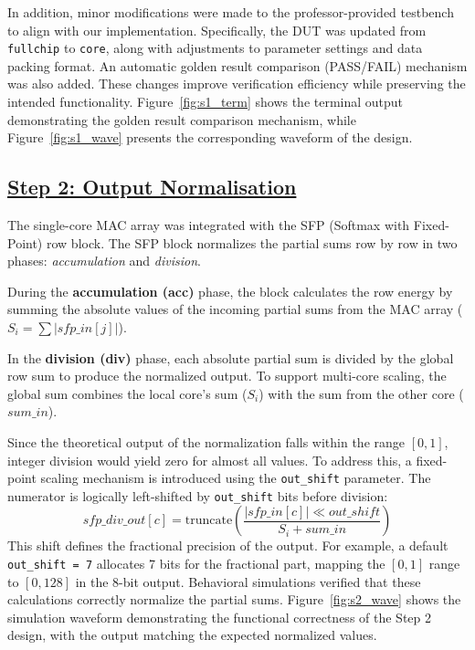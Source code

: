 \documentclass[journal]{IEEEtran}
\begin{document}
In addition, minor modifications were made to the professor-provided testbench to align with our implementation. Specifically, the DUT was updated from \texttt{fullchip} to \texttt{core}, along with adjustments to parameter settings and data packing format. An automatic golden result comparison (PASS/FAIL) mechanism was also added. These changes improve verification efficiency while preserving the intended functionality. Figure~\ref{fig:s1_term} shows the terminal output demonstrating the golden result comparison mechanism, while Figure~\ref{fig:s1_wave} presents the corresponding waveform of the design.




\subsection{\underline{\textnormal{Step 2: Output Normalisation}}}
The single-core MAC array was integrated with the SFP (Softmax with Fixed-Point) row block. The SFP block normalizes the partial sums row by row in two phases: \textit{accumulation} and \textit{division}. 

During the \textbf{accumulation (acc)} phase, the block calculates the row energy by summing the absolute values of the incoming partial sums from the MAC array ($S_i = \sum |sfp\_in[j]|$). 

In the \textbf{division (div)} phase, each absolute partial sum is divided by the global row sum to produce the normalized output. To support multi-core scaling, the global sum combines the local core's sum ($S_i$) with the sum from the other core ($sum\_in$). 

Since the theoretical output of the normalization falls within the range $[0, 1]$, integer division would yield zero for almost all values. To address this, a fixed-point scaling mechanism is introduced using the \texttt{out\_shift} parameter. The numerator is logically left-shifted by \texttt{out\_shift} bits before division: 
\[ sfp\_div\_out[c] = \text{truncate}\left(\frac{|sfp\_in[c]| \ll out\_shift}{S_i + sum\_in}\right) \]
This shift defines the fractional precision of the output. For example, a default \texttt{out\_shift = 7} allocates 7 bits for the fractional part, mapping the $[0, 1]$ range to $[0, 128]$ in the 8-bit output. Behavioral simulations verified that these calculations correctly normalize the partial sums. Figure~\ref{fig:s2_wave} shows the simulation waveform demonstrating the functional correctness of the Step 2 design, with the output matching the expected normalized values.
\end{document}
